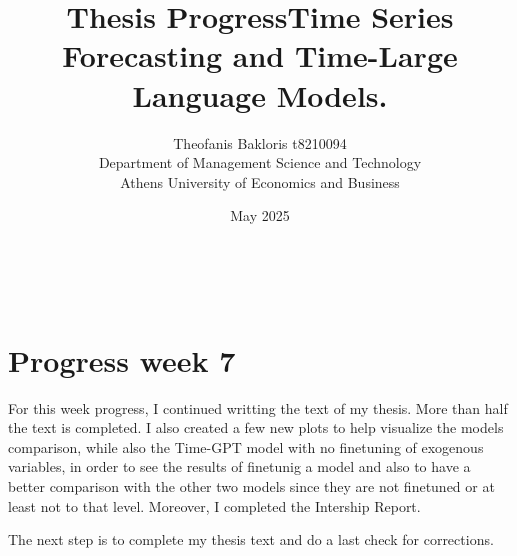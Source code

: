 \documentclass{article}
\title{\textbf{Thesis Progress}}
\author{Theofanis Bakloris t8210094\\
Department of Management Science and Technology\\
Athens University of Economics and Business}
\date{May 2025}
\begin{document}

\maketitle

\title{\textbf{Time Series Forecasting and Time-Large Language Models.}}
\\

\section*{Progress week 7}

For this week progress, I continued writting the text of my thesis. More than half the text is completed. I also created a few new plots to help visualize the models comparison, while also the Time-GPT model with no finetuning of exogenous variables, in order to see the results of finetunig a model and also to have a better comparison with the other two models since they are not finetuned or at least not to that level. Moreover, I completed the Intership Report. 

The next step is to complete my thesis text and do a last check for corrections.




\nocite{*}
\end{document}
